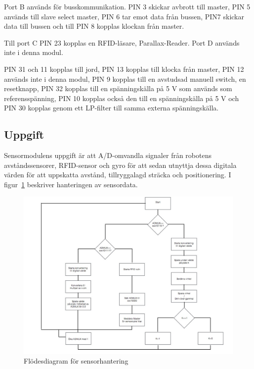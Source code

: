 \documentclass[a4paper,12pt,fleqn]{article}
\begin{document}
Port B används för busskommunikation. PIN 3 skickar avbrott till master, PIN 5 används till slave select master, PIN 6 tar emot data från bussen, PIN7 skickar data till bussen och till PIN 8 kopplas klockan från master.

Till port C PIN 23 kopplas en RFID-läsare, Parallax-Reader. Port D används inte i denna modul. 

PIN 31 och 11 kopplas till jord, PIN 13 kopplas till klocka från master, PIN 12 används inte i denna modul, PIN 9 kopplas till en avstudsad manuell switch, en resetknapp, PIN 32 kopplas till en spänningskälla på 5 V som används som referensspänning, PIN 10 kopplas också den till en spänningskälla på 5 V och PIN 30 kopplas genom ett LP-filter till samma externa spänningskälla.

\subsection{Uppgift}
Sensormodulens uppgift är att A/D-omvandla signaler från robotens avståndssensorer, RFID-sensor och gyro för att sedan utnyttja dessa digitala värden för att uppskatta avstånd, tillryggalagd sträcka och positionering. I figur~\ref{fig:sensorflow} beskriver hanteringen av sensordata.

\begin{figure}[htp] %
  \begin{center}
  \includegraphics[keepaspectratio=true,width=\linewidth]{sensorflode}  %
  \end{center}
  \caption{Flödesdiagram för sensorhantering} %
  \label{fig:sensorflow}
\end{figure}
\end{document}
